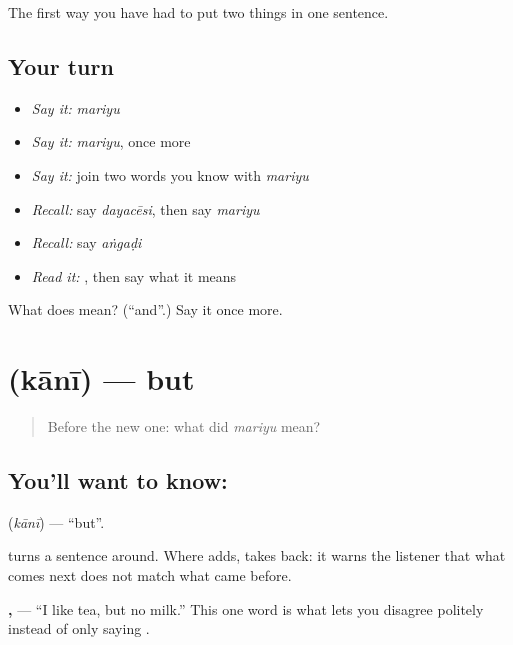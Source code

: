 \begin{grammarlens}[title={What you've built}]
The first way you have had to put two things in one sentence.
\end{grammarlens}

\subsection*{Your turn}
\begin{itemize}
\raggedright
  \item \emph{Say it:} \emph{mariyu}
  \item \emph{Say it:} \emph{mariyu}, once more
  \item \emph{Say it:} join two words you know with \emph{mariyu}
  \item \emph{Recall:} say \emph{dayacēsi}, then say \emph{mariyu}
  \item \emph{Recall:} say \emph{aṅgaḍi}
  \item \emph{Read it:} \textbf{}, then say what it means
\end{itemize}

\begin{tcolorbox}[breakable,colback=teal!4,colframe=teal!35!black,title={Before you move on}]
What does  mean? (\textquotedblleft{}and\textquotedblright{}.) Say it once more.
\end{tcolorbox}
\section[\texorpdfstring{\te{కానీ} (kānī)}{కానీ (kānī)}]{ (kānī) — but}

\label{lesson:TE-C74-but}



\begin{quote}
Before the new one: what did \emph{mariyu} mean?
\end{quote}

\subsection*{You'll want to know: }
\textbf{} (\emph{kānī}) — \textquotedblleft{}but\textquotedblright{}.

 turns a sentence around. Where  adds,  takes back: it warns the listener that what comes next does not match what came before.

\textbf{  ,   } — \textquotedblleft{}I like tea, but no milk.\textquotedblright{} This one word is what lets you disagree politely instead of only saying .

